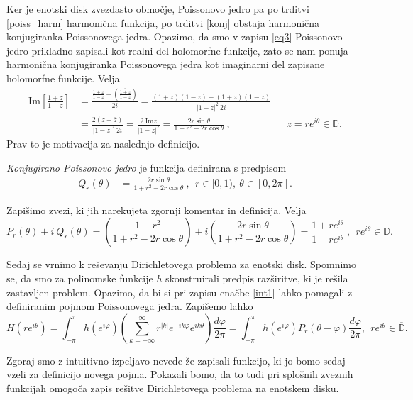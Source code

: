 \documentclass[mat1, tisk]{fmfdelo}
\begin{document}
    Ker je enotski disk zvezdasto območje, Poissonovo jedro pa po trditvi \ref{poiss_harm} harmonična funkcija, po trditvi \ref{konj} obstaja harmonična konjugiranka Poissonovega jedra. 
    Opazimo, da smo v zapisu \eqref{eq3} Poissonovo jedro prikladno zapisali kot realni del holomorfne funkcije, zato se nam ponuja harmonična konjugiranka Poissonovega jedra kot imaginarni del zapisane holomorfne funkcije.
    Velja
    \begin{align*}
        \text{Im}\left[\frac{1 + z}{1-z}\right] &= \frac{\frac{1 + z}{1-z} - \left(\overline{\frac{1 + z}{1-z}}\right)}{2i} = \frac{(1 + z)(1 - \overline{z}) - (1 + \overline{z})(1 - z)}{|1 - z|^2~2i} & & \\ 
        & = \frac{2 (z - \overline{z})}{|1 - z|^2~2i} = \frac{2~\text{Im}z}{|1 - z|^2} = \frac{2 r \sin\theta}{1+ r^2 - 2r \cos\theta}~, & & z = r e^{i\theta} \in \mathbb{D}.
    \end{align*}
    Prav to je motivacija za naslednjo definicijo. 
    \begin{definicija}
        \emph{Konjugirano Poissonovo jedro} je funkcija definirana s predpisom
        \begin{align}
            Q_r(\theta) & = \frac{2 r \sin\theta}{1+ r^2 - 2r \cos\theta}~,~~r \in [0,1),~\theta \in [0,2\pi].
        \end{align}
    \end{definicija}

    Zapišimo zvezi, ki jih narekujeta zgornji komentar in definicija. Velja
    $$
    P_r(\theta) + i~Q_r(\theta) = \left( \frac{1-r^2}{1+ r^2 - 2r \cos\theta}\right) + i \left(\frac{2 r \sin\theta}{1+ r^2 - 2r \cos\theta}\right) = \frac{1 + re^{i\theta}}{1 - re^{i\theta}}~,~~r e^{i\theta} \in \mathbb{D}.
    $$      

    Sedaj se vrnimo k reševanju Dirichletovega problema za enotski disk. 
    Spomnimo se, da smo za polinomske funkcije $h$ skonstruirali predpis razširitve, ki je rešila zastavljen problem. 
    Opazimo, da bi si pri zapisu enačbe \eqref{int1} lahko pomagali z definiranim pojmom Poissonovega jedra. Zapišemo lahko
    $$
    H(r e^{i \theta}) = \int_{-\pi}^{\pi}{h(e^{i \varphi}) \left(\sum_{k = - \infty}^{\infty} r^{|k|} e^{- i k \varphi} e^{i k \theta} \right)}\frac{d \varphi}{2 \pi} = 
    \int_{-\pi}^{\pi}{h(e^{i \varphi}) P_r(\theta - \varphi)\frac{d \varphi}{2 \pi}},~~r e^{i \theta} \in \overline{\mathbb{D}}.
    $$

    Zgoraj smo z intuitivno izpeljavo nevede že zapisali funkcijo, ki jo bomo sedaj vzeli za definicijo novega pojma. 
    Pokazali bomo, da to tudi pri splošnih zveznih funkcijah omogoča zapis rešitve Dirichletovega problema na enotskem disku.
\end{document}
